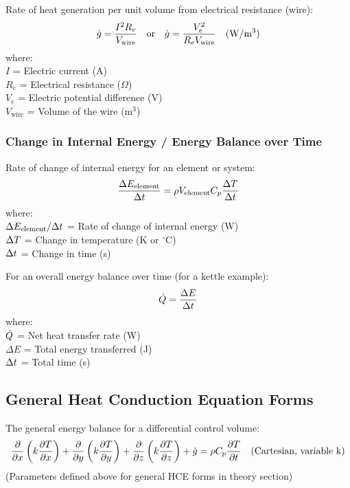Rate of heat generation per unit volume from electrical resistance (wire):
\begin{equation}
    \dot{g} = \frac{I^2 R_e}{V_{\text{wire}}} \quad \text{or} \quad \dot{g} = \frac{V_e^2}{R_e V_{\text{wire}}} \quad \text{(W/m$^3$)}
\end{equation}
where: \\
$I$ = Electric current (A) \\
$R_e$ = Electrical resistance ($\Omega$) \\
$V_e$ = Electric potential difference (V) \\
$V_{\text{wire}}$ = Volume of the wire (m$^3$)

\subsubsection*{Change in Internal Energy / Energy Balance over Time}
Rate of change of internal energy for an element or system:
\begin{equation}
\label{eq:internal_energy_rate_formula}
    \frac{\Delta E_{\text{element}}}{\Delta t} = \rho V_{\text{element}} C_p \frac{\Delta T}{\Delta t}
\end{equation}
where: \\
$\Delta E_{\text{element}}/\Delta t$ = Rate of change of internal energy (W) \\
$\Delta T$ = Change in temperature (K or $^\circ$C) \\
$\Delta t$ = Change in time (s)

For an overall energy balance over time (for a kettle example):
\begin{equation}
    \dot{Q} = \frac{\Delta E}{\Delta t}
\end{equation}
where: \\
$\dot{Q}$ = Net heat transfer rate (W) \\
$\Delta E$ = Total energy transferred (J) \\
$\Delta t$ = Total time (s)

\subsection{General Heat Conduction Equation Forms}
The general energy balance for a differential control volume:
\begin{equation}
\label{eq:general_energy_balance_differential_formal_formula}
    \frac{\partial}{\partial x}\left(k \frac{\partial T}{\partial x}\right) + \frac{\partial}{\partial y}\left(k \frac{\partial T}{\partial y}\right) + \frac{\partial}{\partial z}\left(k \frac{\partial T}{\partial z}\right) + \dot{g} = \rho C_p \frac{\partial T}{\partial t} \quad \text{(Cartesian, variable k)}
\end{equation}
(Parameters defined above for general HCE forms in theory section)

